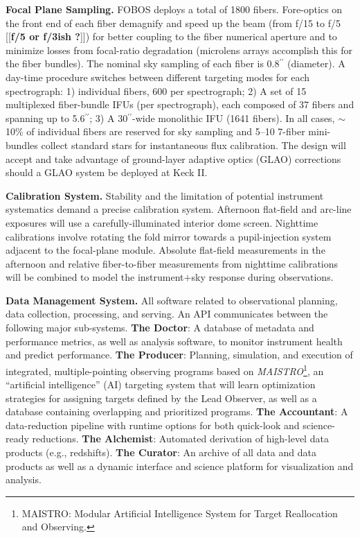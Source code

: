 \documentclass[oneside,11pt]{amsart}
\newcommand{\arcsec}{\mbox{$^{\prime\prime}$}}
\newcommand{\comment}[2][todo]{{\color{#1}[[{\bf #2}]]}}
\begin{document}
\noindent \textbf{Focal Plane Sampling.} FOBOS deploys a total of
1800 fibers. Fore-optics on the front end of each fiber demagnify and
speed up the beam (from f/15 to f/5 \comment{f/5 or f/3ish ?}) for
better coupling to the fiber numerical aperture and to minimize
losses from focal-ratio degradation (microlens arrays accomplish this
for the fiber bundles). The nominal sky sampling of each fiber is
0.8\arcsec{} (diameter). A day-time procedure switches between
different targeting modes for each spectrograph: 1) individual
fibers, 600 per spectrograph; 2) A set of 15 multiplexed fiber-bundle
IFUs (per spectrograph), each composed of 37 fibers and spanning up
to 5.6\arcsec{}; 3) A 30\arcsec{}-wide monolithic IFU (1641 fibers).
In all cases, $\sim$10\% of individual fibers are reserved for sky
sampling and 5--10 7-fiber mini-bundles collect standard stars for
instantaneous flux calibration. The design will accept and take
advantage of ground-layer adaptive optics (GLAO) corrections should a
GLAO system be deployed at Keck II.

\noindent \textbf{Calibration System.} Stability and the limitation
of potential instrument systematics demand a precise calibration
system. Afternoon flat-field and arc-line exposures will use a
carefully-illuminated interior dome screen. Nighttime calibrations
involve rotating the fold mirror towards a pupil-injection system
adjacent to the focal-plane module. Absolute flat-field measurements
in the afternoon and relative fiber-to-fiber measurements from
nighttime calibrations will be combined to model the instrument$+$sky
response during observations.

\noindent \textbf{Data Management System.} All software related to
observational planning, data collection, processing, and serving. An
API communicates between the following major sub-systems. {\bf The
Doctor}: A database of metadata and performance metrics, as well as
analysis software, to monitor instrument health and predict
performance. {\bf The Producer}: Planning, simulation, and execution
of integrated, multiple-pointing observing programs based on {\it
MAISTRO}\footnote{MAISTRO: Modular Artificial Intelligence System for
Target Reallocation and Observing.}, an ``artificial intelligence''
(AI) targeting system that will learn optimization strategies for
assigning targets defined by the Lead Observer, as well as a database
containing overlapping and prioritized programs. {\bf The
Accountant}: A data-reduction pipeline with runtime options for both
quick-look and science-ready reductions. {\bf The Alchemist}:
Automated derivation of high-level data products (e.g., redshifts).
{\bf The Curator}: An archive of all data and data products as well
as a dynamic interface and science platform for visualization and
analysis.
\end{document}

